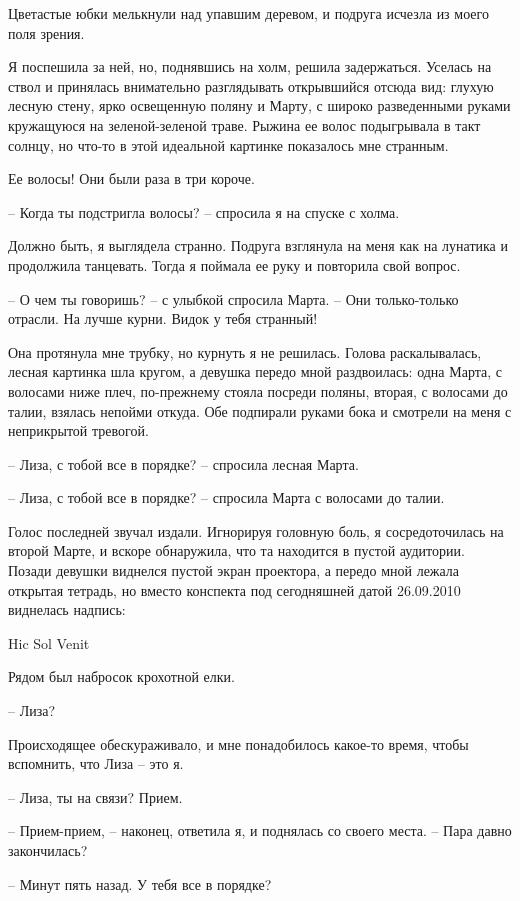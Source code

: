 \documentclass[
]{book}
\begin{document}
Цветастые юбки мелькнули над упавшим деревом, и подруга исчезла из моего поля зрения.

Я поспешила за ней, но, поднявшись на холм, решила задержаться. Уселась на ствол и принялась внимательно разглядывать открывшийся отсюда вид: глухую лесную стену, ярко освещенную поляну и Марту, с широко разведенными руками кружащуюся на зеленой-зеленой траве. Рыжина ее волос подыгрывала в такт солнцу, но что-то в этой идеальной картинке показалось мне странным.

Ее волосы! Они были раза в три короче.

-- Когда ты подстригла волосы? -- спросила я на спуске с холма.

Должно быть, я выглядела странно. Подруга взглянула на меня как на лунатика и продолжила танцевать. Тогда я поймала ее руку и повторила свой вопрос.

-- О чем ты говоришь? -- с улыбкой спросила Марта. -- Они только-только отрасли. На лучше курни. Видок у тебя странный!

Она протянула мне трубку, но курнуть я не решилась. Голова раскалывалась, лесная картинка шла кругом, а девушка передо мной раздвоилась: одна Марта, с волосами ниже плеч, по-прежнему стояла посреди поляны, вторая, с волосами до талии, взялась непойми откуда. Обе подпирали руками бока и смотрели на меня с неприкрытой тревогой.

-- Лиза, с тобой все в порядке? -- спросила лесная Марта.

-- Лиза, с тобой все в порядке? -- спросила Марта с волосами до талии.

Голос последней звучал издали. Игнорируя головную боль, я сосредоточилась на второй Марте, и вскоре обнаружила, что та находится в пустой аудитории. Позади девушки виднелся пустой экран проектора, а передо мной лежала открытая тетрадь, но вместо конспекта под сегодняшней датой 26.09.2010 виднелась надпись:

Hic Sol Venit

Рядом был набросок крохотной елки.

-- Лиза?

Происходящее обескураживало, и мне понадобилось какое-то время, чтобы вспомнить, что Лиза -- это я.

-- Лиза, ты на связи? Прием.

-- Прием-прием, -- наконец, ответила я, и поднялась со своего места. -- Пара давно закончилась?

-- Минут пять назад. У тебя все в порядке?
\end{document}
